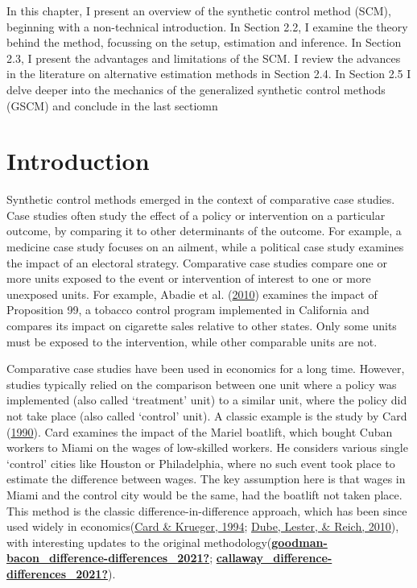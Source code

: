 \documentclass[12pt,nobind, a4paper]{reedthesis}
\begin{document}
 In this chapter, I present an overview of the synthetic control method (SCM), beginning with a non-technical introduction. In Section 2.2, I examine the theory behind the method, focussing on the setup, estimation and inference. In Section 2.3, I present the advantages and limitations of the SCM. I review the advances in the literature on alternative estimation methods in Section 2.4. In Section 2.5 I delve deeper into the mechanics of the generalized synthetic control methods (GSCM) and conclude in the last sectiomn

 \hypertarget{introduction}{%
 \section{Introduction}\label{introduction}}

 Synthetic control methods emerged in the context of comparative case studies. Case studies often study the effect of a policy or intervention on a particular outcome, by comparing it to other determinants of the outcome. For example, a medicine case study focuses on an ailment, while a political case study examines the impact of an electoral strategy. Comparative case studies compare one or more units exposed to the event or intervention of interest to one or more unexposed units. For example, Abadie et al. (\protect\hyperlink{ref-abadie_synthetic_2010}{2010}) examines the impact of Proposition 99, a tobacco control program implemented in California and compares its impact on cigarette sales relative to other states. Only some units must be exposed to the intervention, while other comparable units are not.
 \linebreak

 Comparative case studies have been used in economics for a long time. However, studies typically relied on the comparison between one unit where a policy was implemented (also called `treatment' unit) to a similar unit, where the policy did not take place (also called `control' unit). A classic example is the study by Card (\protect\hyperlink{ref-card_impact_1990}{1990}). Card examines the impact of the Mariel boatlift, which bought Cuban workers to Miami on the wages of low-skilled workers. He considers various single `control' cities like Houston or Philadelphia, where no such event took place to estimate the difference between wages. The key assumption here is that wages in Miami and the control city would be the same, had the boatlift not taken place. This method is the classic difference-in-difference approach, which has been since used widely in economics(\protect\hyperlink{ref-card_minimum_1994}{Card \& Krueger, 1994}; \protect\hyperlink{ref-dube_minimum_2010}{Dube, Lester, \& Reich, 2010}), with interesting updates to the original methodology(\protect\hyperlink{ref-goodman-bacon_difference-differences_2021}{\textbf{goodman-bacon\_difference-differences\_2021?}}; \protect\hyperlink{ref-callaway_difference-differences_2021}{\textbf{callaway\_difference-differences\_2021?}}).
 \linebreak
\end{document}
